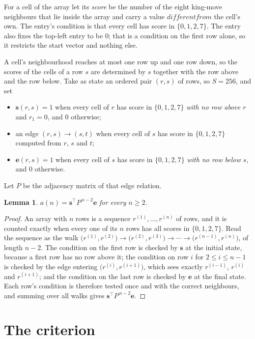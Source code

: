 \documentclass[11pt,a4paper]{article}
\theoremstyle{plain}
\newtheorem{lemma}[theorem]{Lemma}
\theoremstyle{definition}
\begin{document}
For a cell of the array let its \emph{score} be the number of the eight king-move neighbours that lie inside
the array and carry a value $different from$ the cell's own. The entry's condition is that every cell
has score in $\{0,1,2,7\}$. The entry also fixes the top-left entry to be $0$; that is a condition on the first row alone, so it restricts the start vector and nothing else.

A cell's neighbourhood reaches at most one row up and one row down, so the scores of the
cells of a row $s$ are determined by $s$ together with the row above and the row below.
Take as state an ordered pair $(r,s)$ of rows, so $S=256$, and set
\begin{itemize}
\item $\mathbf{s}(r,s)=1$ when every cell of $r$ has score in $\{0,1,2,7\}$ \emph{with no row
above $r$} and $r_1=0$, and $0$ otherwise;
\item an edge $(r,s)\to(s,t)$ when every cell of $s$ has score in $\{0,1,2,7\}$ computed from
$r$, $s$ and $t$;
\item $\mathbf{e}(r,s)=1$ when every cell of $s$ has score in $\{0,1,2,7\}$ \emph{with no row
below $s$}, and $0$ otherwise.
\end{itemize}
Let $P$ be the adjacency matrix of that edge relation.

\begin{lemma}\label{lem:walk}
$a(n)=\mathbf{s}^{\!\top}P^{\,n-2}\mathbf{e}$ for every $n\ge2$.
\end{lemma}

\begin{proof}
An array with $n$ rows is a sequence $r^{(1)},\dots,r^{(n)}$ of rows, and it is counted
exactly when every one of its $n$ rows has all scores in $\{0,1,2,7\}$. Read the sequence as the
walk $\bigl(r^{(1)},r^{(2)}\bigr)\to\bigl(r^{(2)},r^{(3)}\bigr)\to\cdots\to
\bigl(r^{(n-1)},r^{(n)}\bigr)$, of length $n-2$. The condition on the first row is
checked by $\mathbf{s}$ at the initial state, because a first row has no row above it; the
condition on row $i$ for $2\le i\le n-1$ is checked by the edge entering
$\bigl(r^{(i)},r^{(i+1)}\bigr)$, which sees exactly $r^{(i-1)}$, $r^{(i)}$ and
$r^{(i+1)}$; and the condition on the last row is checked by $\mathbf{e}$ at the final
state. Each row's condition is therefore tested once and with the correct neighbours, and
summing over all walks gives $\mathbf{s}^{\!\top}P^{\,n-2}\mathbf{e}$.
\end{proof}

\section{The criterion}
\end{document}
